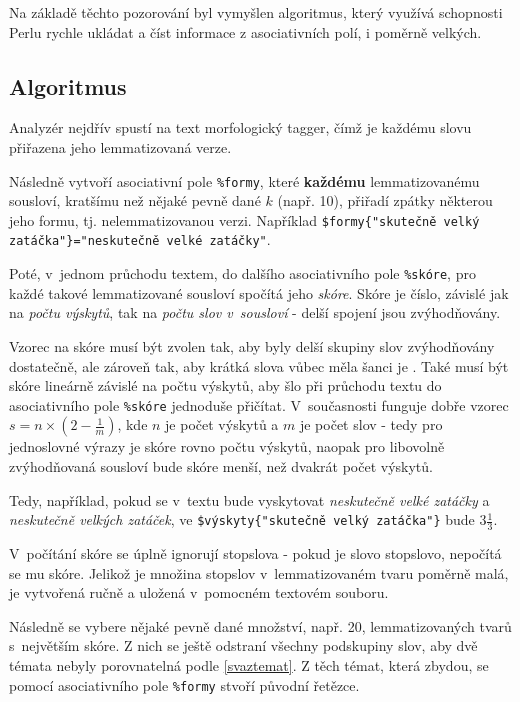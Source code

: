 \documentclass[12pt]{amsart}
\begin{document}
Na základě těchto pozorování byl vymyšlen algoritmus, který využívá schopnosti Perlu rychle ukládat a číst informace z asociativních polí, i poměrně velkých. 

\subsection{Algoritmus}
Analyzér nejdřív spustí na text morfologický tagger, čímž je každému slovu přiřazena jeho lemmatizovaná verze. 

Následně vytvoří asociativní pole \texttt{\%formy}, které \textbf{každému}  lemmatizovanému sousloví, kratšímu než nějaké pevně dané $k$ (např. 10), přiřadí zpátky některou jeho formu, tj. nelemmatizovanou verzi. Například \newline \verb,$formy{"skutečně velký zatáčka"}="neskutečně velké zatáčky",.

Poté, v~jednom průchodu textem, do dalšího asociativního pole \texttt{\%skóre}, pro každé takové lemmatizované sousloví spočítá jeho \emph{skóre}. Skóre je číslo, závislé jak na \emph{počtu výskytů}, tak na \emph{počtu slov v~sousloví} - delší spojení jsou zvýhodňovány. 

Vzorec na skóre musí být zvolen tak, aby byly delší skupiny slov zvýhodňovány dostatečně, ale zároveň tak, aby krátká slova vůbec měla šanci je . Také musí být skóre lineárně závislé na počtu výskytů, aby šlo při průchodu textu do asociativního pole \texttt{\%skóre} jednoduše přičítat. V~současnosti funguje dobře vzorec $s = n\times(2-\frac{1}{m})$, kde $n$ je počet výskytů a $m$ je počet slov - tedy pro jednoslovné výrazy je skóre rovno počtu výskytů, naopak pro libovolně zvýhodňovaná sousloví bude skóre menší, než dvakrát počet výskytů.

Tedy, například, pokud se v~textu bude vyskytovat \emph{neskutečně velké zatáčky} a \emph{neskutečně velkých zatáček}, ve \verb,$výskyty{"skutečně velký zatáčka"}, bude $3\frac{1}{3}$.

V~počítání skóre se úplně ignorují stopslova - pokud je slovo stopslovo, nepočítá se mu skóre. Jelikož je množina stopslov v~lemmatizovaném tvaru poměrně malá, je vytvořená ručně a uložená v~pomocném textovém souboru.

Následně se vybere nějaké pevně dané množství, např. 20, lemmatizovaných tvarů s~největším skóre. Z nich se ještě odstraní všechny podskupiny slov, aby dvě témata nebyly porovnatelná podle \ref{svaztemat}. Z těch témat, která zbydou, se pomocí asociativního pole \texttt{\%formy} stvoří původní řetězce.
\end{document}
